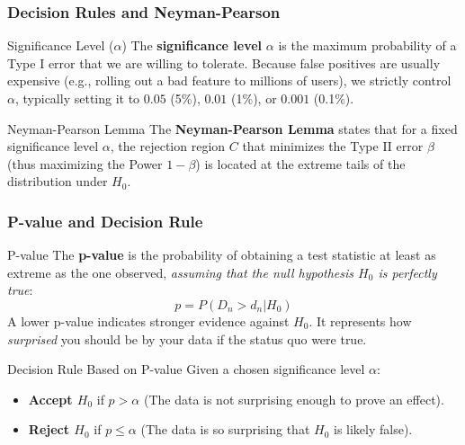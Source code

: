 \subsubsection{Decision Rules and Neyman-Pearson}

\begin{defbox}{Significance Level ($\alpha$)}
 The \textbf{significance level} $\alpha$ is the maximum probability of a Type I error that we are willing to tolerate. Because false positives are usually expensive (e.g., rolling out a bad feature to millions of users), we strictly control $\alpha$, typically setting it to $0.05$ (5\%), $0.01$ (1\%), or $0.001$ (0.1\%).
\end{defbox}

\begin{defbox}{Neyman-Pearson Lemma}
 The \textbf{Neyman-Pearson Lemma} states that for a fixed significance level $\alpha$, the rejection region $C$ that minimizes the Type II error $\beta$ (thus maximizing the Power $1 - \beta$) is located at the extreme tails of the distribution under $H_0$.
\end{defbox}

\subsubsection{P-value and Decision Rule}

\begin{defbox}{P-value}
 The \textbf{p-value} is the probability of obtaining a test statistic at least as extreme as the one observed, \textit{assuming that the null hypothesis $H_0$ is perfectly true}:
 \[
  p = P(D_n > d_n | H_0)
 \]
 A lower p-value indicates stronger evidence against $H_0$. It represents how \textit{surprised} you should be by your data if the status quo were true.
\end{defbox}

\begin{defbox}{Decision Rule Based on P-value}
 Given a chosen significance level $\alpha$:
 \begin{itemize}
  \item \textbf{Accept $H_0$} if $p > \alpha$ (The data is not surprising enough to prove an effect).
  \item \textbf{Reject $H_0$} if $p \leq \alpha$ (The data is so surprising that $H_0$ is likely false).
 \end{itemize}
\end{defbox}

